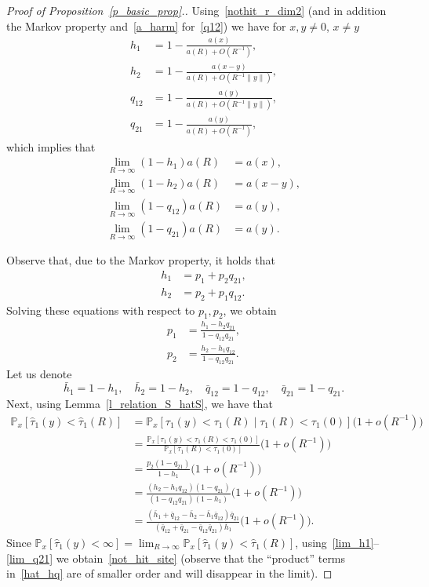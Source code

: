 \documentclass[10pt]{amsart}
\theoremstyle{definition}\newtheorem{defi}[theo]{Definition}\newtheorem{rema}[theo]{Remark}\newtheorem{exam}[theo]{Example}\newtheorem{exem}[theo]{Example}\newtheorem{nota}[theo]{Notation}
\newcommand{\1}[1]{{\mathbf 1}{\{#1\}}}
\newcommand{\8}{{\infty}}
\newcommand{\hh}{{\bar h}}
\newcommand{\hq}{{\bar q}}
\newcommand{\IP}{{\mathbb P}}
\newcommand{\htau}{\widehat{\tau}}
\begin{document}
\begin{proof}[Proof of Proposition~\ref{p_basic_prop}.]
Using~\eqref{nothit_r_dim2} (and in addition the Markov property and~\eqref{a_harm} for~\eqref{q12}) we have for $x,y \neq 0$, $x \neq y$
\begin{align}
h_1&=1-\frac{a(x)}{a(R)+O(R^{-1})},\label{h1}
\\
h_2&=1-\frac{a(x-y)}{a(R)+O(R^{-1}\|y\|)},\label{h2}
\\
q_{12}&=1-\frac{a(y)}{a(R)+O(R^{-1}\|y\|)},\label{q12}
\\
q_{21}&=1-\frac{a(y)}{a(R)+O(R^{-1})},\label{q21}
\end{align}
which implies that
\begin{align}
\lim_{R\to\infty} (1-h_1)a(R)&=a(x),\label{lim_h1}
\\
\lim_{R\to\infty} (1-h_2)a(R)&=a(x-y),\label{lim_h2}
\\
\lim_{R\to\infty} (1-q_{12})a(R) &= a(y),\label{lim_q12}
\\
\lim_{R\to\infty} (1-q_{21})a(R) &=a(y).\label{lim_q21}
\end{align}

Observe that, due to the Markov property, it holds that
\begin{align*}
h_1 &= p_1 + p_2q_{21},\\
h_2 &= p_2 + p_1q_{12}.
\end{align*}
Solving these equations with respect to $p_1,p_2$, we obtain
\begin{align}
p_1 &= \frac{h_1-h_2q_{21}}{1-q_{12}q_{21}},\label{expr_p1}
\\
p_2 &= \frac{h_2-h_1q_{12}}{1-q_{12}q_{21}}.\label{expr_p2}
\end{align}
Let us denote
\begin{equation}\label{bar_all}
\hh_1=1-h_1, \quad \hh_2=1-h_2,\quad
\hq_{12}=1-q_{12},\quad \hq_{21}=1-q_{21}.
\end{equation}
Next, using
Lemma~\ref{l_relation_S_hatS}, we have that
\begin{align}
\IP_x[\htau_1(y)<\htau_1(R)] &= \IP_x[\tau_1(y)<\tau_1(R)\mid \tau_1(R)<\tau_1(0)]
\big(1+o(R^{-1})\big)\nonumber\\
&=\frac{\IP_x[\tau_1(y)<\tau_1(R)<\tau_1(0)]}{\IP_x[\tau_1(R)<\tau_1(0)]}
\big(1+o(R^{-1})\big)\nonumber\\
&=\frac{p_2(1-q_{21})}{1-h_1} \big(1+o(R^{-1})\big)\nonumber\\
&= \frac{(h_2-h_1q_{12})(1-q_{21})}{(1-q_{12}q_{21})(1-h_1)}
\big(1+o(R^{-1})\big)\nonumber\\
&= \frac{(\hh_1+\hq_{12}-\hh_2-\hh_1\hq_{12})\hq_{21}} {(\hq_{12}+\hq_{21}-\hq_{12}\hq_{21})\hh_1} \big(1+o(R^{-1})\big).\label{hat_hq}
\end{align}
Since $\IP_x[\htau_1(y)<\infty]=\lim_{R\to\infty}
\IP_x[\htau_1(y)<\htau_1(R)]$, using~\eqref{lim_h1}--\eqref{lim_q21} we obtain~\eqref{not_hit_site} (observe that the ``product'' terms in~\eqref{hat_hq} are of smaller order and will disappear in the limit).
\end{proof}
\end{document}
